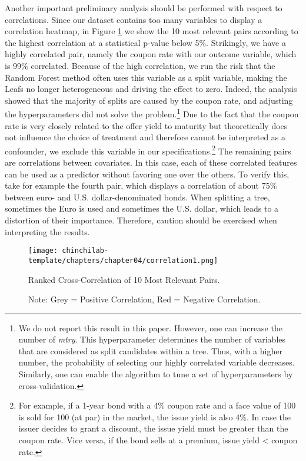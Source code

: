 Another important preliminary analysis should be performed with respect to correlations. Since our dataset contains too many variables to display a correlation heatmap, in Figure \ref{corr} we show the 10 most relevant pairs according to the highest correlation at a statistical p-value below 5\%. Strikingly, we have a highly correlated pair, namely the coupon rate with our outcome variable, which is 99\% correlated. Because of the high correlation, we run the risk that the Random Forest method often uses this variable as a split variable, making the Leafs no longer heterogeneous and driving the effect to zero. Indeed, the analysis showed that the majority of splits are caused by the coupon rate, and adjusting the hyperparameters did not solve the problem.\footnote{We do not report this result in this paper. However, one can increase the number of \textit{mtry}. This hyperparameter determines the number of variables that are considered as split candidates within a tree. Thus, with a higher number, the probability of selecting our highly correlated variable decreases. Similarly, one can enable the algorithm to tune a set of hyperparameters by cross-validation.} Due to the fact that the coupon rate is very closely related to the offer yield to maturity but theoretically does not influence the choice of treatment and therefore cannot be interpreted as a confounder, we exclude this variable in our specifications.\footnote{For example, if a 1-year bond with a 4\% coupon rate and a face value of 100 is sold for 100 (at par) in the market, the issue yield is also 4\%. In case the issuer decides to grant a discount, the issue yield must be greater than the coupon rate. Vice versa, if the bond sells at a premium, issue yield < coupon rate.} The remaining pairs are correlations between covariates. In this case, each of these correlated features can be used as a predictor without favoring one over the others. To verify this, take for example the fourth pair, which displays a correlation of about 75\% between euro- and U.S. dollar-denominated bonds. When splitting a tree, sometimes the Euro is used and sometimes the U.S. dollar, which leads to a distortion of their importance. Therefore, caution should be exercised when interpreting the results.

\begin{figure}[ht!]
    \centering
    \texttt{[image: chinchilab-template/chapters/chapter04/correlation1.png]}
    \caption{Ranked Cross-Correlation of 10 Most Relevant Pairs.}
    \caption*{Note: Grey = Positive Correlation, Red = Negative Correlation.}
    \label{corr}
\end{figure}

